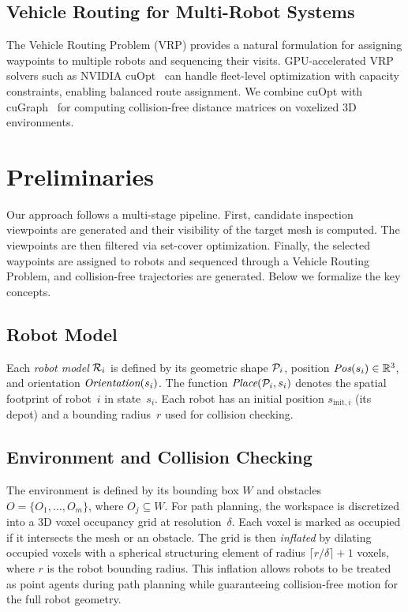 \documentclass[letterpaper, 10 pt, conference]{ieeeconf}  %
\begin{document}
\subsection{Vehicle Routing for Multi-Robot Systems}
The Vehicle Routing Problem (VRP) provides a natural formulation for assigning waypoints to multiple robots and sequencing their visits. GPU-accelerated VRP solvers such as NVIDIA cuOpt~\cite{cuopt} can handle fleet-level optimization with capacity constraints, enabling balanced route assignment. We combine cuOpt with cuGraph~\cite{cugraph} for computing collision-free distance matrices on voxelized 3D environments.

\section{Preliminaries}

Our approach follows a multi-stage pipeline. First, candidate inspection viewpoints are generated and their visibility of the target mesh is computed. The viewpoints are then filtered via set-cover optimization. Finally, the selected waypoints are assigned to robots and sequenced through a Vehicle Routing Problem, and collision-free trajectories are generated. Below we formalize the key concepts.

\subsection{Robot Model}

Each \emph{robot model} ${\cal R}_i$ is defined by its geometric shape ${\cal P}_i$, position $\mbox{\em Pos}(s_i) \in \mathbb{R}^3$, and orientation $\mbox{\em Orientation}(s_i)$. The function $\mbox{\em Place}({\cal P}_i, s_i)$ denotes the spatial footprint of robot~$i$ in state~$s_i$. Each robot has an initial position $s_{\text{init},i}$ (its depot) and a bounding radius~$r$ used for collision checking.

\subsection{Environment and Collision Checking}

The environment is defined by its bounding box $W$ and obstacles $O=\{O_1,\ldots,O_m\}$, where $O_j\subseteq W$. For path planning, the workspace is discretized into a 3D voxel occupancy grid at resolution~$\delta$. Each voxel is marked as occupied if it intersects the mesh or an obstacle. The grid is then \emph{inflated} by dilating occupied voxels with a spherical structuring element of radius $\lceil r/\delta \rceil + 1$ voxels, where $r$ is the robot bounding radius. This inflation allows robots to be treated as point agents during path planning while guaranteeing collision-free motion for the full robot geometry.
\end{document}
